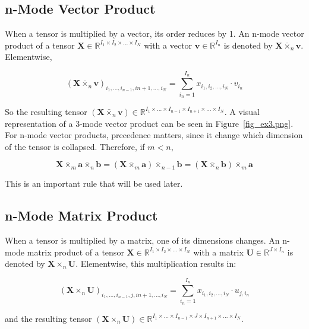 \documentclass[twocolumn,10pt]{asme2ej}
\begin{document}
\subsection{n-Mode Vector Product}

When a tensor is multiplied by a vector, its order reduces by 1. An n-mode vector product of a tensor $\bm{X} \in \mathbb{R}^{I_1 \times I_2 \times ... \times I_N}$ with a vector $\bm{v} \in \mathbb{R}^{I_n}$ is denoted by $\bm{X} \bar{\times}_n \bm{v}$. Elementwise,

\begin{equation}
(\bm{X} \bar{\times}_n \bm{v} )_{i_1, ..., i_{n-1}, i{n+1}, ..., i_N} = \sum_{i_n = 1}^{I_n} x_{i_1, i_2, ..., i_N}\cdot v_{i_n}
\end{equation}

So the resulting tensor $(\bm{X} \bar{\times}_n \bm{v} ) \in \mathbb{R}^{I_1 \times ... \times I_{n-1} \times I_{n+1} \times ... \times I_N}$. A visual representation of a 3-mode vector product can be seen in Figure~\ref{fig_ex3.png}.
For n-mode vector products, precedence matters, since it change which dimension of the tensor is collapsed. Therefore, if $m < n$,

\begin{equation}
\bm{X} \bar{\times}_m \bm{a} \bar{\times}_n \bm{b} = (\bm{X} \bar{\times}_m \bm{a}) \bar{\times}_{n-1} \bm{b} = (\bm{X} \bar{\times}_n \bm{b}) \bar{\times}_m \bm{a}
\label{eq_vectorMode}
\end{equation}

This is an important rule that will be used later.

\subsection{n-Mode Matrix Product}
When a tensor is multiplied by a matrix, one of its dimensions changes. An n-mode matrix product of a tensor $\bm{X} \in \mathbb{R}^{I_1 \times I_2 \times ... \times I_N}$ with a matrix $\bm{U} \in \mathbb{R}^{J \times I_n}$ is denoted by $\bm{X} \times_n \bm{U}$. Elementwise, this multiplication results in:

\begin{equation}
(\bm{X} \times_n \bm{U} )_{i_1, ..., i_{n-1}, j, i{n+1}, ..., i_N} = \sum_{i_n = 1}^{I_n} x_{i_1, i_2, ..., i_N}\cdot u_{j,i_n}
\end{equation}

and the resulting tensor $(\bm{X} \times_n \bm{U} ) \in \mathbb{R}^{I_1 \times ... \times I_{n-1} \times J \times I_{n+1} \times ... \times I_N}$.
\end{document}
